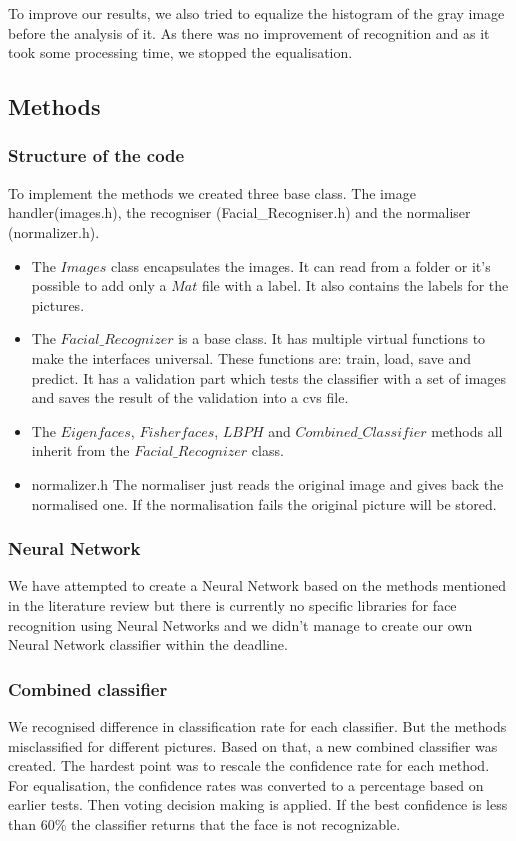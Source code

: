 To improve our results, we also tried to equalize the histogram of the gray image before the analysis of it. As there was no improvement of recognition and as it took some processing time, we stopped the equalisation.

\subsection{Methods}
\subsubsection{Structure of the code}

To implement the methods we created three base class. The image handler(images.h), the recogniser (Facial\_Recogniser.h) and the normaliser (normalizer.h).
\begin{itemize}
	\item The $Images$ class encapsulates the images. It can read from a folder or it's possible to add only a $Mat$ file with a label. It also contains the labels for the pictures.
	
	\item The $Facial\_Recognizer$ is a base class. It has multiple virtual functions to make the interfaces universal. These functions are: train, load, save and predict. It has a validation part which tests the classifier with a set of images and saves the result of the validation into a cvs file.
	
	\item The $Eigenfaces$, $Fisherfaces$, $LBPH$ and $Combined\_Classifier$ methods all inherit from the $Facial\_Recognizer$ class.
	
	\item normalizer.h
	The normaliser just reads the original image and gives back the normalised one. If the normalisation fails the original picture will be stored.
	
\end{itemize}

\subsubsection{Neural Network}
We have attempted to create a Neural Network based on the methods mentioned in the literature review but there is currently no specific libraries for face recognition using Neural 
Networks and we didn't manage to create our own Neural Network classifier within the deadline.

\subsubsection{Combined classifier}
We recognised difference in classification rate for each classifier. But the methods misclassified for different pictures. Based on that, a new combined classifier was created. The hardest point was to rescale the confidence rate for each method. For equalisation, the confidence rates was converted to a percentage based on earlier tests. Then voting decision making is applied. If the best confidence is less than 60\% the classifier returns that the face is not recognizable.

